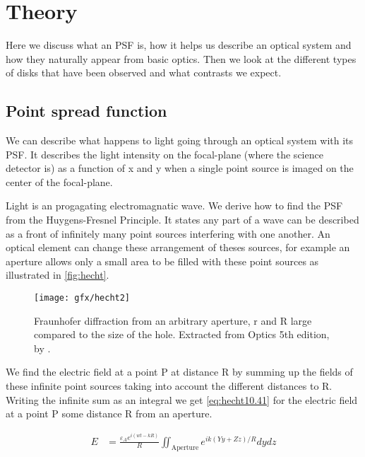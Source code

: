 
\chapter{Theory} %
\label{ch:theory} %
Here we discuss what an \ac{PSF} is, how it helps us describe an optical system and how they naturally appear from basic optics. Then we look at the different types of disks that have been observed and what contrasts we expect.
\section{Point spread function}
\label{sec:PSF}

We can describe what happens to light going through an optical system with its \ac{PSF}. It describes the light intensity on the focal-plane (where the science detector is) as a function of x and y when a single point source is imaged on the center of the focal-plane. 

Light is an progagating electromagnatic wave. We derive how to find the \ac{PSF} from the Huygens-Fresnel Principle. It states any part of a wave can be described as a front of infinitely many point sources interfering with one another. An optical element can change these arrangement of theses sources, for example an aperture allows only a small area to be filled with these point sources as illustrated in \autoref{fig:hecht}. 

\begin{figure}[h]
    \caption{Fraunhofer diffraction from an arbitrary aperture, r and R large compared to the size of the hole. Extracted from Optics 5th edition, by \cite{hecht}.}
    \centering
    \texttt{[image: gfx/hecht2]}
    \label{fig:hecht}
\end{figure}

We find the electric field at a point P at distance R by summing up the fields of these infinite point sources taking into account the different distances to R. Writing the infinite sum as an integral we get \autoref{eq:hecht10.41} for the electric field at a point P some distance R from an aperture.

\begin{subequations}
    \begin{align}
        E &= \frac{\varepsilon_A e^{i(wt-kR)}}{R} \iint_{\text{Aperture}} e^{ik(Yy+Zz)/R} dydz
    \end{align}
    \label{eq:hecht10.41}
\end{subequations}

